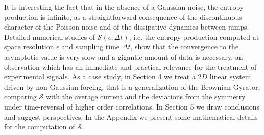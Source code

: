 \documentclass[12pt]{iopart}
\newcommand{\cS} {\mathcal{S}}
\begin{document}
It is interesting the fact that in the absence of  a Gaussian noise,  the entropy production is infinite,
as a straightforward consequence  of the discontinuous character of the Poisson noise and of the dissipative dynamics between jumps.
Detailed numerical studies  of $\cS(\epsilon, \Delta t)$, i.e. the entropy production  computed at  space resolution $\epsilon$ and  sampling time $\Delta t$,
show that the convergence to the asymptotic value is very slow and a gigantic amount of data is necessary,  
an observation which has an immediate and practical relevance for the treatment of experimental signals.
  As a case study,  in  Section 4  we treat a $2D$ linear system driven by non Gaussian forcing,
  that is a generalization of the Brownian Gyrator, comparing  $\cS$ with the average current and the
  deviations from the symmetry under time-reversal of higher order correlations. In Section 5 we draw conclusions and suggest perspectives.
In  the Appendix  we present some mathematical details for the computation of $\cS$.


\end{document}
